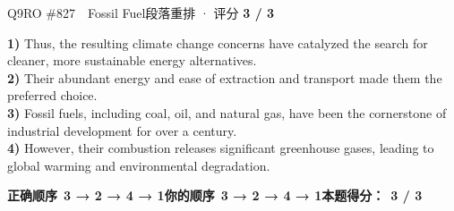 \begin{qblock}{Q9\quad RO \#827\ \ Fossil Fuel}{段落重排 · 评分 \textcolor{cAccent}{\bfseries 3 / 3}}
\begin{promptbox}
\textbf{1)} Thus, the resulting climate change concerns have catalyzed the search for cleaner, more sustainable energy alternatives.\\
\textbf{2)} Their abundant energy and ease of extraction and transport made them the preferred choice.\\
\textbf{3)} Fossil fuels, including coal, oil, and natural gas, have been the cornerstone of industrial development for over a century.\\
\textbf{4)} However, their combustion releases significant greenhouse gases, leading to global warming and environmental degradation.
\end{promptbox}
\smallskip
\textbf{正确顺序}\ \textcolor{cFix}{\bfseries 3 → 2 → 4 → 1}\qquad\textbf{你的顺序}\ \textcolor{cFix}{\bfseries 3 → 2 → 4 → 1}\qquad\textbf{本题得分：}\ {\color{cAccent}\bfseries 3 / 3}
\end{qblock}

